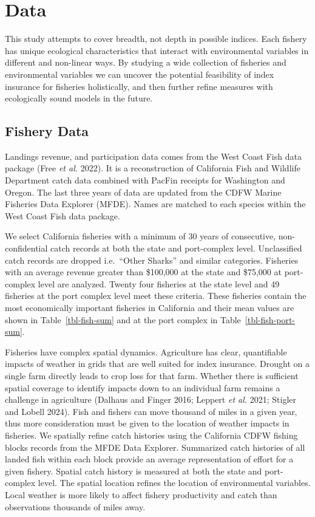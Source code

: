 \documentclass[
  letterpaper,
  DIV=11,
  numbers=noendperiod]{scrartcl}
\begin{document}
\hypertarget{sec-data}{%
\section{Data}\label{sec-data}}

This study attempts to cover breadth, not depth in possible indices.
Each fishery has unique ecological characteristics that interact with
environmental variables in different and non-linear ways. By studying a
wide collection of fisheries and environmental variables we can uncover
the potential feasibility of index insurance for fisheries holistically,
and then further refine measures with ecologically sound models in the
future.

\hypertarget{fishery-data}{%
\subsection{Fishery Data}\label{fishery-data}}

Landings revenue, and participation data comes from the West Coast Fish
data package (Free \emph{et al.} 2022). It is a reconstruction of
California Fish and Wildlife Department catch data combined with PacFin
receipts for Washington and Oregon. The last three years of data are
updated from the CDFW Marine Fisheries Data Explorer (MFDE). Names are
matched to each species within the West Coast Fish data package.

We select California fisheries with a minimum of 30 years of
consecutive, non-confidential catch records at both the state and
port-complex level. Unclassified catch records are dropped i.e.~``Other
Sharks'' and similar categories. Fisheries with an average revenue
greater than \$100,000 at the state and \$75,000 at port-complex level
are analyzed. Twenty four fisheries at the state level and 49 fisheries
at the port complex level meet these criteria. These fisheries contain
the most economically important fisheries in California and their mean
values are shown in Table~\ref{tbl-fish-sum} and at the port complex in
Table~\ref{tbl-fish-port-sum}.

Fisheries have complex spatial dynamics. Agriculture has clear,
quantifiable impacts of weather in grids that are well suited for index
insurance. Drought on a single farm directly leads to crop loss for that
farm. Whether there is sufficient spatial coverage to identify impacts
down to an individual farm remains a challenge in agriculture (Dalhaus
and Finger 2016; Leppert \emph{et al.} 2021; Stigler and Lobell 2024).
Fish and fishers can move thousand of miles in a given year, thus more
consideration must be given to the location of weather impacts in
fisheries. We spatially refine catch histories using the California CDFW
fishing blocks records from the MFDE Data Explorer. Summarized catch
histories of all landed fish within each block provide an average
representation of effort for a given fishery. Spatial catch history is
measured at both the state and port-complex level. The spatial location
refines the location of environmental variables. Local weather is more
likely to affect fishery productivity and catch than observations
thousands of miles away.
\end{document}
